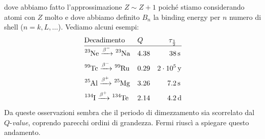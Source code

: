 dove abbiamo fatto l'approssimazione $Z\sim Z+1$ poiché stiamo considerando atomi con $Z$ molto  e dove abbiamo definito $B_n$ la binding energy per $n$ numero di shell ($n = k,L,\dots$). Vediamo alcuni esempi:
\begin{displaymath}
\begin{aligned}
&\text{Decadimento} & &Q & \tau_{\frac{1}{2}}& \\
\hline
&\ce{^{23}Ne} \betamin \ce{^{23}Na} & &4.38 & 38&\,\mbox{s} \\
&\ce{^{99}Tc} \betamin \ce{^{99}Ru} & &0.29 & 2\cdot 10^5&\,\mbox{y} \\
&\ce{^{25}Al} \betaplu \ce{^{25}Mg} & &3.26 & 7.2&\,\mbox{s} \\
&\ce{^{134}I} \betaplu \ce{^{134}Te} & &2.14 & 4.2&\,\mbox{d} \\
\end{aligned}
\end{displaymath}
Da queste osservazioni sembra che il periodo di dimezzamento sia scorrelato dal $Q$-\textit{value}, coprendo parecchi ordini di grandezza. Fermi riuscì a spiegare questo andamento.